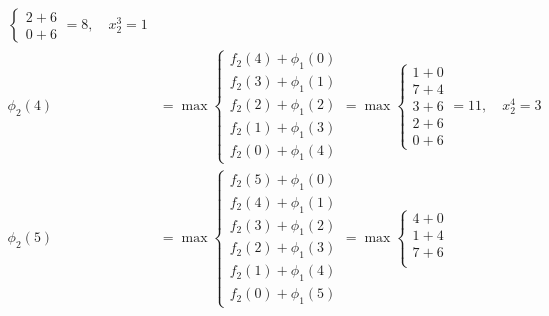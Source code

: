 \documentclass{article}
\begin{document}
\[\begin{aligned}
\begin{cases}
                                                  2 + 6 \\
                                                  0 + 6
                                              \end{cases} = 8, \quad x_2^3 = 1                \\
        \phi_2(4) & = \max \begin{cases}
                               f_2(4) + \phi_1(0) \\
                               f_2(3) + \phi_1(1) \\
                               f_2(2) + \phi_1(2) \\
                               f_2(1) + \phi_1(3) \\
                               f_2(0) + \phi_1(4)
                           \end{cases} = \max \begin{cases}
                                                  1 + 0 \\
                                                  7 + 4 \\
                                                  3 + 6 \\
                                                  2 + 6 \\
                                                  0 + 6
                                              \end{cases} = 11, \quad x_2^4 = 3               \\
        \phi_2(5) & = \max \begin{cases}
                               f_2(5) + \phi_1(0) \\
                               f_2(4) + \phi_1(1) \\
                               f_2(3) + \phi_1(2) \\
                               f_2(2) + \phi_1(3) \\
                               f_2(1) + \phi_1(4) \\
                               f_2(0) + \phi_1(5)
                           \end{cases} = \max \begin{cases}
                                                  4 + 0 \\
                                                  1 + 4 \\
                                                  7 + 6 \\

\end{cases}
\end{aligned}\]
\end{document}
